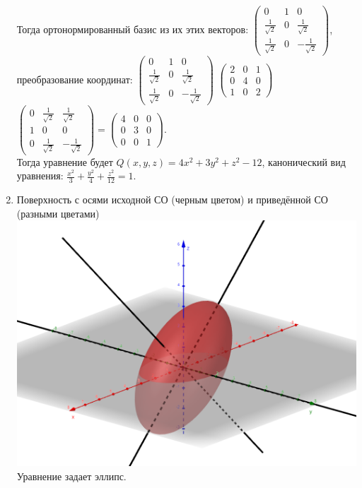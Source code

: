 \begin{enumerate}
Тогда ортонормированный базис из их этих векторов: $\begin{pmatrix} 0 & 1 & 0 \\ \frac{1}{\sqrt{2}} & 0 & \frac{1}{\sqrt{2}} \\ \frac{1}{\sqrt{2}} & 0 & -\frac{1}{\sqrt{2}}\end{pmatrix}$, преобразование координат:  $\begin{pmatrix} 0 & 1 & 0 \\ \frac{1}{\sqrt{2}} & 0 & \frac{1}{\sqrt{2}} \\ \frac{1}{\sqrt{2}} & 0 & -\frac{1}{\sqrt{2}}\end{pmatrix}$ $\begin{pmatrix} 2 & 0 & 1 \\ 0 & 4 & 0 \\ 1 & 0 & 2 \end{pmatrix}$ $\begin{pmatrix} 0 & \frac{1}{\sqrt{2}} & \frac{1}{\sqrt{2}} \\ 1 & 0 & 0 \\ 0 & \frac{1}{\sqrt{2}} & -\frac{1}{\sqrt{2}}\end{pmatrix} = \begin{pmatrix} 4 & 0 & 0 \\ 0 & 3 & 0 \\ 0 & 0 & 1 \end{pmatrix}$.\\

Тогда уравнение будет $Q(x,y,z) = 4x^2 + 3y^2 + z^2 - 12$, канонический вид уравнения: $\frac{x^2}{3} + \frac{y^2}{4} + \frac{z^2}{12} = 1$.
	\item Поверхность с осями исходной СО (черным цветом) и приведённой СО (разными цветами) \includegraphics[scale=0.5]{images/2_2} \\
Уравнение задает эллипс.

\end{enumerate} 

